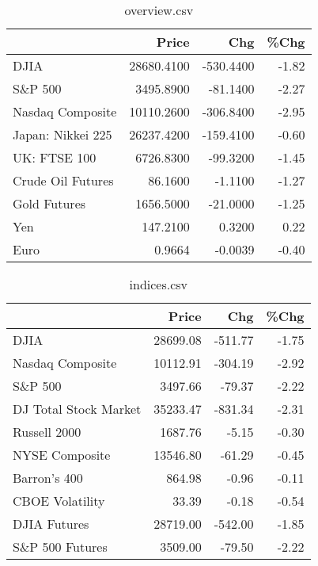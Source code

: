 \documentclass{article}%
\begin{document}
\begin{table}[htbp]%
\caption{overview.csv}%
\centering%
\begin{adjustbox}{width=1\textwidth}%
\begin{tabular}{lrrr}
\toprule
                  &      Price &       Chg &  \%Chg \\
\midrule
             DJIA & 28680.4100 & -530.4400 & -1.82 \\
          S\&P 500 &  3495.8900 &  -81.1400 & -2.27 \\
 Nasdaq Composite & 10110.2600 & -306.8400 & -2.95 \\
Japan: Nikkei 225 & 26237.4200 & -159.4100 & -0.60 \\
     UK: FTSE 100 &  6726.8300 &  -99.3200 & -1.45 \\
Crude Oil Futures &    86.1600 &   -1.1100 & -1.27 \\
     Gold Futures &  1656.5000 &  -21.0000 & -1.25 \\
              Yen &   147.2100 &    0.3200 &  0.22 \\
             Euro &     0.9664 &   -0.0039 & -0.40 \\
\bottomrule
\end{tabular}
%
\end{adjustbox}%
\end{table}

%


\begin{table}[htbp]%
\caption{indices.csv}%
\centering%
\begin{adjustbox}{width=1\textwidth}%
\begin{tabular}{lrrr}
\toprule
                      &    Price &     Chg &  \%Chg \\
\midrule
                 DJIA & 28699.08 & -511.77 & -1.75 \\
     Nasdaq Composite & 10112.91 & -304.19 & -2.92 \\
              S\&P 500 &  3497.66 &  -79.37 & -2.22 \\
DJ Total Stock Market & 35233.47 & -831.34 & -2.31 \\
         Russell 2000 &  1687.76 &   -5.15 & -0.30 \\
       NYSE Composite & 13546.80 &  -61.29 & -0.45 \\
         Barron's 400 &   864.98 &   -0.96 & -0.11 \\
      CBOE Volatility &    33.39 &   -0.18 & -0.54 \\
         DJIA Futures & 28719.00 & -542.00 & -1.85 \\
      S\&P 500 Futures &  3509.00 &  -79.50 & -2.22 \\
\bottomrule
\end{tabular}
%
\end{adjustbox}%
\end{table}
\end{document}
